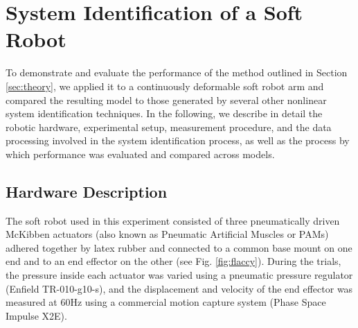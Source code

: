 \section{System Identification of a Soft Robot}
\label{sec:experiment}

To demonstrate and evaluate the performance of the method outlined in Section \ref{sec:theory}, we applied it to a continuously deformable soft robot arm and compared the resulting model to those generated by several other nonlinear system identification techniques.
In the following, we describe in detail the robotic hardware, experimental setup, measurement procedure, and the data processing involved in the system identification process, as well as the process by which performance was evaluated and compared across models.


\subsection{Hardware Description}

The soft robot used in this experiment consisted of three pneumatically driven McKibben actuators (also known as Pneumatic Artificial Muscles or PAMs) adhered together by latex rubber and connected to a common base mount on one end and to an end effector on the other (see Fig. \ref{fig:flaccy}).
During the trials, the pressure inside each actuator was varied using a pneumatic pressure regulator {(Enfield TR-010-g10-s)}, and the displacement and velocity of the end effector was measured at $60 \text{Hz}$ using a commercial motion capture system (Phase Space Impulse X2E).

